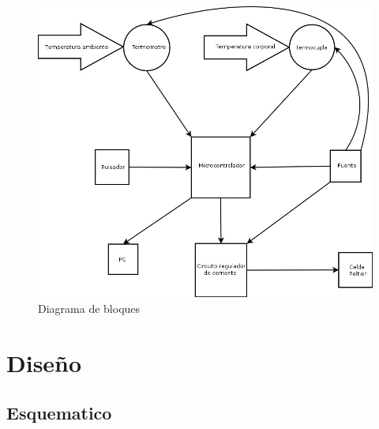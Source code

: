 \documentclass[10pt,spanish,a4paper,openany,notitlepage]{article}
\begin{document}
\begin{figure}[H] %
\begin{center}
\includegraphics[scale=0.5]{./imagenes/diagrama_de_bloques.png}
\caption{Diagrama de bloques}
 \label{fig:diag_bloques}
\end{center}
\end{figure}


\section{Diseño}

\subsection{Esquematico}
\end{document}

